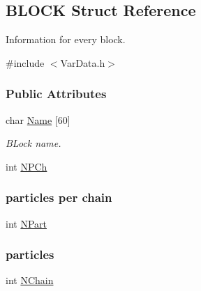 \hypertarget{structBLOCK}{}\subsection{B\+L\+O\+CK Struct Reference}
\label{structBLOCK}


Information for every block.  




{\ttfamily \#include $<$Var\+Data.\+h$>$}

\subsubsection*{Public Attributes}
\begin{DoxyCompactItemize}
\item 
char \hyperlink{structBLOCK_a7b413349ba4d10cbeb9b09be7c471c9e}{Name} \mbox{[}60\mbox{]}\hypertarget{structBLOCK_a7b413349ba4d10cbeb9b09be7c471c9e}{}\label{structBLOCK_a7b413349ba4d10cbeb9b09be7c471c9e}

\begin{DoxyCompactList}\small\item\em B\+Lock name. \end{DoxyCompactList}\item 
int \hyperlink{structBLOCK_a521663d12899e0fefe0a182332a8573f}{N\+P\+Ch}\hypertarget{structBLOCK_a521663d12899e0fefe0a182332a8573f}{}\label{structBLOCK_a521663d12899e0fefe0a182332a8573f}

\begin{DoxyCompactList}\small\item\em \subsubsection*{particles per chain}\end{DoxyCompactList}\item 
int \hyperlink{structBLOCK_abdcc792391d8c5092471dff191de47f4}{N\+Part}\hypertarget{structBLOCK_abdcc792391d8c5092471dff191de47f4}{}\label{structBLOCK_abdcc792391d8c5092471dff191de47f4}

\begin{DoxyCompactList}\small\item\em \subsubsection*{particles}\end{DoxyCompactList}\item 
int \hyperlink{structBLOCK_aa49e4d7af0d71e79524ef6fb081707b5}{N\+Chain}\hypertarget{structBLOCK_aa49e4d7af0d71e79524ef6fb081707b5}{}\label{structBLOCK_aa49e4d7af0d71e79524ef6fb081707b5}


\end{DoxyCompactItemize}
